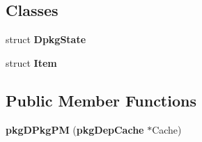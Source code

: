 \subsection*{\-Classes}
\begin{DoxyCompactItemize}
\item 
struct {\bf \-Dpkg\-State}
\item 
struct {\bf \-Item}
\end{DoxyCompactItemize}
\subsection*{\-Public \-Member \-Functions}
\begin{DoxyCompactItemize}
\item 
{\bfseries pkg\-D\-Pkg\-P\-M} ({\bf pkg\-Dep\-Cache} $\ast$\-Cache)\label{classpkgDPkgPM_ae29383cddb81e16ced7d45d1bb76ddc5}

\end{DoxyCompactItemize}
